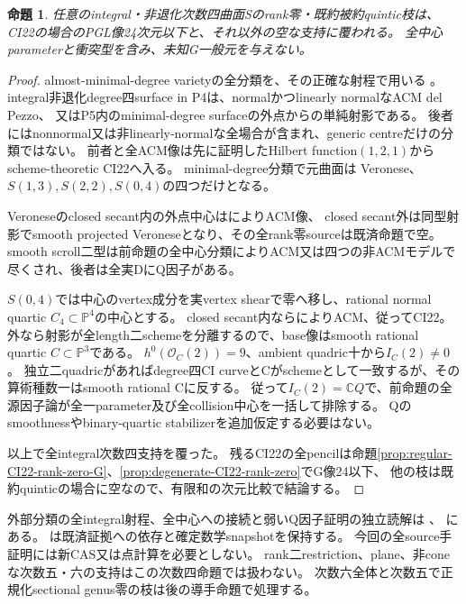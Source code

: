 \documentclass[a4paper,11pt]{ltjsarticle}
\newtheorem{proposition}{命題}[section]
\theoremstyle{definition}
\begin{document}
\begin{proposition}\label{prop:all-degree-four-rank-zero-G}
任意のintegral・非退化次数四曲面Sのrank零・既約被約quintic枝は、
CI22の場合のPGL像24次元以下と、それ以外の空な支持に覆われる。
全中心parameterと衝突型を含み、未知G一般元を与えない。
\end{proposition}
\begin{proof}
almost-minimal-degree varietyの全分類を、その正確な射程で用いる
\cite[Introduction, pp.1--2; Remark 6.1(A), p.16]{brodmannpark}。
integral非退化degree四surface in P4は、normalかつlinearly normalなACM del Pezzo、
又はP5内のminimal-degree surfaceの外点からの単純射影である。
後者にはnonnormal又は非linearly-normalな全場合が含まれ、generic centreだけの分類ではない。
前者と全ACM像は先に証明したHilbert function$(1,2,1)$からscheme-theoretic CI22へ入る。
minimal-degree分類\cite[Notation and Remark 2.1, p.4]{brodmannpark}で元曲面は
Veronese、$S(1,3),S(2,2),S(0,4)$の四つだけとなる。

Veroneseのclosed secant内の外点中心は\cite[Remark 6.3(A), p.19]{brodmannpark}によりACM像、
closed secant外は同型射影でsmooth projected Veroneseとなり、その全rank零sourceは既済命題で空。
smooth scroll二型は前命題の全中心分類によりACM又は四つの非ACMモデルで尽くされ、後者は全実DにQ因子がある。

$S(0,4)$では中心のvertex成分を実vertex shearで零へ移し、rational normal quartic $C_4\subset\mathbb P^4$の中心とする。
closed secant内なら\cite[Theorem 6.2(a), p.17]{brodmannpark}によりACM、従ってCI22。
外なら射影が全length二schemeを分離するので、base像はsmooth rational quartic $C\subset\mathbb P^3$である。
$h^0(\mathcal O_C(2))=9$、ambient quadric十から$I_C(2)\ne0$。
独立二quadricがあればdegree四CI curveとCがschemeとして一致するが、その算術種数一はsmooth rational Cに反する。
従って$I_C(2)=\mathbb C Q$で、前命題の全源因子論が全一parameter及び全collision中心を一括して排除する。
Qのsmoothnessやbinary-quartic stabilizerを追加仮定する必要はない。

以上で全integral次数四支持を覆った。
残るCI22の全pencilは命題\ref{prop:regular-CI22-rank-zero-G}、\ref{prop:degenerate-CI22-rank-zero}でG像24以下、
他の枝は既約quinticの場合に空なので、有限和の次元比較で結論する。
\end{proof}
外部分類の全integral射程、全中心への接続と弱いQ因子証明の独立読解は
、
にある。
は既済証拠への依存と確定数学snapshotを保持する。
今回の全source手証明には新CAS又は点計算を必要としない。
rank二restriction、plane、非coneな次数五・六の支持はこの次数四命題では扱わない。
次数六全体と次数五で正規化sectional genus零の枝は後の導手命題で処理する。
\end{document}
